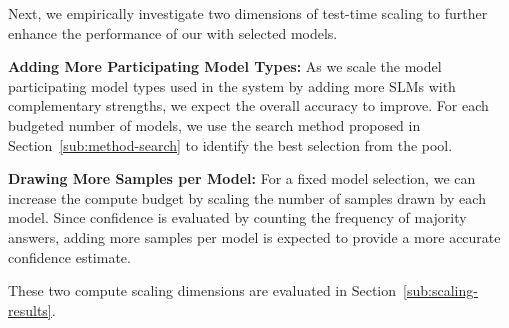 Next, we empirically investigate two dimensions of test-time scaling to further enhance the performance of our \NAME{}{} with selected models.

\textbf{Adding More Participating Model Types:} As we scale the model participating model types used in the system by adding more SLMs with complementary strengths, we expect the overall accuracy to improve. For each budgeted number of models, we use the search method proposed in Section~\ref{sub:method-search} to identify the best selection from the pool. 

\textbf{Drawing More Samples per Model:} For a fixed model selection, we can increase the compute budget by scaling the number of samples drawn by each model. Since confidence is evaluated by counting the frequency of majority answers, adding more samples per model is expected to provide a more accurate confidence estimate.


These two compute scaling dimensions are evaluated in Section~\ref{sub:scaling-results}.





